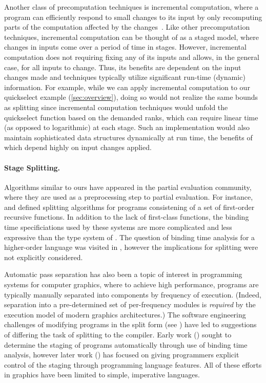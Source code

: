 Another class of precomputation techniques is incremental
computation, where a program can efficiently respond to small changes
to its input by only recomputing parts of the computation affected
by the
changes~\cite{DemersReTe81,PughTe89,RamalingamRe93,AcarBlBlHaTa09}.
Like other precomputation techniques, incremental computation can be
thought of as a staged model, where changes in inputs come over a
period of time in stages.
%
However, incremental computation does not requiring fixing any of its
inputs and allows, in the general case, for all inputs to
change. Thus, its benefits are dependent on the input changes made and
techniques typically utilize significant run-time (dynamic)
information.  For example, while we can apply incremental computation
to our quickselect example (\ref{sec:overview}), doing so would not
realize the same bounds as splitting since incremental computation
techniques would unfold the quickselect function based on the demanded
ranks, which can require linear time (as opposed to logarithmic) at
each stage.  Such an implementation would also maintain sophisticated
data structures dynamically at run time, the benefits of which depend
highly on input changes applied.

\paragraph{Stage Splitting.}

Algorithms similar to ours have appeared in the partial evaluation community,
where they are used as a preprocessing step to partial evaluation. 
For instance, \cite{Mogensen89a} and \cite{DeNiel91} defined splitting algorithms
for programs consistening of a set of first-order recursive functions.
In addition to the lack of first-class functions, 
the binding time specificiations used by these systems are more complicated and less expressive than the type system of \lang.
The question of binding time analysis for a higher-order language was visited in \cite{Mogensen89b},
however the implications for splitting were not explicitly considered.

Automatic pass separation has also been a topic of interest in
programming systems for computer graphics, where to achieve
high performance, programs are typically manually separated into
components by frequency of execution. (Indeed, separation into a pre-determined
set of per-frequency modules is \emph{required} by the execution model
of modern graphics architectures.)  
The software engineering challenges of modifying programs in the split form (see \cite{Foley:2011}) have led to
suggestions of differing the task of splitting to the compiler.
Early work (\cite{knoblock96}) sought to determine the staging of programs automatically through use of binding time analysis,
however later work (\cite{Proudfoot:2001,Foley:2011,He:2014}) has focused on giving programmers explicit control of the staging through 
programming language features. 
All of these efforts in graphics have been limited to simple, imperative languages. 

